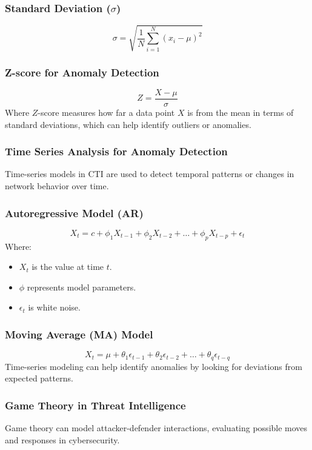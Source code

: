 \documentclass[a4paper,twoside,12pt]{report}
\begin{document}
\subsubsection{Standard Deviation (\(\sigma\))}
\[
\sigma = \sqrt{\frac{1}{N} \sum_{i=1}^N (x_i - \mu)^2}
\]

\subsubsection{Z-score for Anomaly Detection}
\[
Z = \frac{X - \mu}{\sigma}
\]
Where \( Z \)-score measures how far a data point \( X \) is from the mean in terms of standard deviations, which can help identify outliers or anomalies.

\subsubsection{Time Series Analysis for Anomaly Detection}
Time-series models in CTI are used to detect temporal patterns or changes in network behavior over time.

\subsubsection{Autoregressive Model (AR)}
\[
X_t = c + \phi_1 X_{t-1} + \phi_2 X_{t-2} + \dots + \phi_p X_{t-p} + \epsilon_t
\]
Where:
\begin{itemize}
    \item \( X_t \) is the value at time \( t \).
    \item \( \phi \) represents model parameters.
    \item \( \epsilon_t \) is white noise.
\end{itemize}

\subsubsection{Moving Average (MA) Model}
\[
X_t = \mu + \theta_1 \epsilon_{t-1} + \theta_2 \epsilon_{t-2} + \dots + \theta_q \epsilon_{t-q}
\]
Time-series modeling can help identify anomalies by looking for deviations from expected patterns.

\subsubsection{Game Theory in Threat Intelligence}
Game theory can model attacker-defender interactions, evaluating possible moves and responses in cybersecurity.
\end{document}
